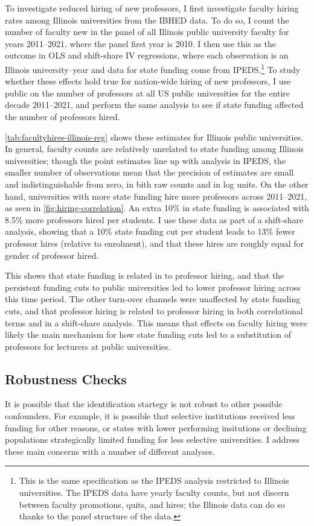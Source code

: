 To investigate reduced hiring of new professors, I first investigate faculty hiring rates among Illinois universities from the IBHED data.
To do so, I count the number of faculty new in the panel of all Illinois public university faculty for years 2011--2021, where the panel first year is 2010.
I then use this as the outcome in OLS and shift-share IV regressions, where each observation is an Illinois university--year and data for state funding come from IPEDS.\footnote{
    This is the same specification as the IPEDS analysis restricted to Illinois universities.
    The IPEDS data have yearly faculty counts, but not discern between faculty promotions, quits, and hires; the Illinois data can do so thanks to the panel structure of the data.
}
To study whether these effects hold true for nation-wide hiring of new professors, I use public on the number of professors at all US public universities for the entire decade 2011--2021, and perform the same analysis to see if state funding affected the number of professors hired.

\autoref{tab:facultyhires-illinois-reg} shows these estimates for Illinois public universities.
In general, faculty counts are relatively unrelated to state funding among Illinois universities; though the point estimates line up with analysis in IPEDS, the smaller number of observations mean that the precision of estimates are small and indistinguishable from zero, in bith raw counts and in log units.
On the other hand, universities with more state funding hire more professors across 2011--2021, as seen in \autoref{fig:hiring-correlation}.
An extra 10\% in state funding is associated with 8.5\% more professors hired per students.
I use these data as part of a shift-share analysis, showing that a 10\% state funding cut per student leads to 13\% fewer professor hires (relative to enrolment), and that these hires are roughly equal for gender of professor hired.

This shows that state funding is related in to professor hiring, and that the persistent funding cuts to public universities led to lower professor hiring across this time period.
The other turn-over channels were unaffected by state funding cuts, and that professor hiring is related to professor hiring in both correlational terms and in a shift-share analysis.
This means that effects on faculty hiring were likely the main mechanism for how state funding cuts led to a substitution of professors for lecturers at public universities.

\subsection{Robustness Checks}
\label{sec:results-robustness}
It is possible that the identification startegy is not robust to other possible confounders.
For example, it is possible that selective institutions received less funding for other reasons, or states with lower performing insitutions or declining populations strategically limited funding for less selective universities.
I address these main concerns with a number of different analyses.

